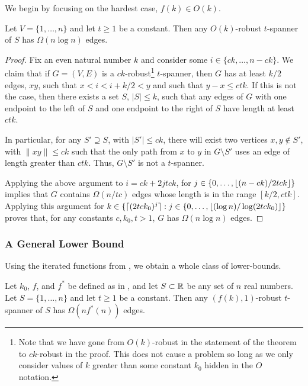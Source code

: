 \documentclass{patmorin}
\begin{document}
We begin by focusing on the hardest case, $f(k) \in O(k)$.

\begin{thm}
  Let $V=\{1,\ldots,n\}$ and let $t\ge 1$ be a constant.  Then any
  $O(k)$-robust $t$-spanner of $S$ has $\Omega(n\log n)$ edges.
\end{thm}

\begin{proof}
  Fix an even natural number $k$ and consider some
  $i\in\{ck,\ldots,n-ck\}$.  We claim that if $G=(V,E)$ is a
  $ck$-robust\footnote{Note that we have gone from $O(k)$-robust in the
  statement of the theorem to $ck$-robust in the proof.  This does not
  cause a problem so long as we only consider values of $k$ greater
  than some constant $k_0$ hidden in the $O$ notation.} $t$-spanner,
  then $G$ has at least $k/2$ edges, $xy$, such that $x < i < i+k/2 <
  y$ and such that $y-x \le ctk$.  If this is not the case, then there
  exists a set $S$, $|S|\le k$, such that any edges of $G$ with one
  endpoint to the left of $S$ and one endpoint to the right of $S$
  have length at least $ctk$.

  In particular, for any $S'\supseteq S$, with $|S'|\le ck$, there will
  exist two vertices $x,y\not\in S'$, with $\|xy\|\le ck$ such that the
  only path from $x$ to $y$ in $G\setminus S'$ uses an edge of length
  greater than $ctk$.  Thus, $G\setminus S'$ is not a $t$-spanner.

  Applying the above argument to $i=ck+2jtck$, for
  $j\in\{0,\ldots,{\lfloor (n-ck)/2tck \rfloor}\}$ implies that $G$ contains
  $\Omega(n/tc)$ edges whose length is in the range $[k/2,ctk]$.
  Applying this argument for $k\in\{{\lceil (2tck_0)^{j} \rceil} :
  j\in\{0,\ldots,{\lfloor (\log n)/\log(2tck_0) \rfloor}\}$ proves that, for any
  constants $c,k_0,t>1$, $G$ has $\Omega(n\log n)$ edges.
\end{proof}


\subsubsection{A General Lower Bound}

Using the iterated functions from , we obtain a whole
class of lower-bounds.

\begin{thm}
  Let $k_0$, $f$, and $f^*$ be defined as in , and let
  $S\subset \mathbb{R}$ be any set of $n$ real numbers.  Let $S=\{1,\ldots,n\}$
  and let $t\ge 1$ be a constant.  Then any $(f(k),1)$-robust $t$-spanner
  of $S$ has $\Omega(nf^*(n))$ edges.
\end{thm}
\end{document}
